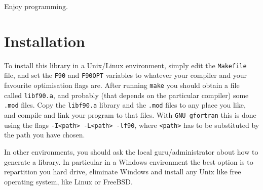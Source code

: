 Enjoy programming.

\section*{Installation}

To install this library in a Unix/Linux environment, simply edit the
\texttt{Makefile} file, and set the \texttt{F90} and \texttt{F90OPT}
variables to whatever your compiler and your favourite optimisation
flags are. After running \texttt{make} you should obtain a file called
\texttt{libf90.a}, and probably (that depends on the particular
compiler) some \texttt{.mod} files. Copy the \texttt{libf90.a} library
and the \texttt{.mod} files to any place you like, and compile and
link your program to that files. With \texttt{GNU gfortran} this is
done using the flags \texttt{-I<path> -L<path> -lf90}, where
\texttt{<path>} has to be substituted by the path you have chosen.

In other environments, you should ask the local guru/administrator
about how to generate a library. In particular in a Windows environment
the best option is to repartition you hard drive, eliminate Windows
and install any Unix like free operating system, like Linux or
FreeBSD. 






 